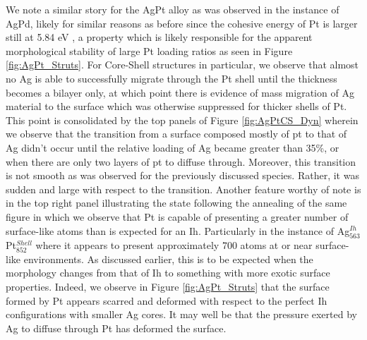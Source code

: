 We note a similar story for the AgPt alloy as was observed in the instance of AgPd, likely for similar reasons as before since the cohesive energy of Pt is larger still at 5.84 eV \cite{kittel_1964}, a property which is likely responsible for the apparent morphological stability of large Pt loading ratios as seen in Figure \ref{fig:AgPt_Struts}. For Core-Shell structures in particular, we observe that almost no Ag is able to successfully migrate through the Pt shell until the thickness becomes a bilayer only, at which point there is evidence of mass migration of Ag material to the surface which was otherwise suppressed for thicker shells of Pt. This point is consolidated by the top panels of Figure \ref{fig:AgPtCS_Dyn} wherein we observe that the transition from a surface composed mostly of pt to that of Ag didn't occur until the relative loading of Ag became greater than 35\%, or when there are only two layers of pt to diffuse through. Moreover, this transition is not smooth as was observed for the previously discussed species. Rather, it was sudden and large with respect to the transition. Another feature worthy of note is in the top right panel illustrating the state following the annealing of the same figure in which we observe that Pt is capable of presenting a greater number of surface-like atoms than is expected for an Ih. Particularly in the instance of Ag$_{563}^{Ih}$Pt$_{852}^{Shell}$ where it appears to present approximately 700 atoms at or near surface-like environments. As discussed earlier, this is to be expected when the morphology changes from that of Ih to something with more exotic surface properties. Indeed, we observe in Figure \ref{fig:AgPt_Struts} that the surface formed by Pt appears scarred and deformed with respect to the perfect Ih configurations with smaller Ag cores. It may well be that the pressure exerted by Ag to diffuse through Pt has deformed the surface.

